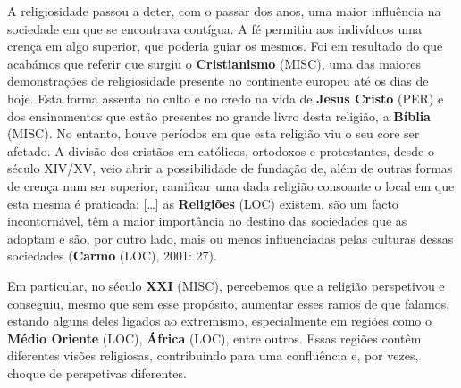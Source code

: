 \documentclass[12pt,a4paper]{article}
\begin{document}
A religiosidade passou a deter, com o passar dos anos, uma maior influência na sociedade em que se encontrava contígua. A fé permitiu aos indivíduos uma crença em algo superior, que poderia guiar os mesmos. Foi em resultado do que acabámos que referir que surgiu o \textbf{Cristianismo} (MISC), uma das maiores demonstrações de religiosidade presente no continente europeu até os dias de hoje. Esta forma assenta no culto e no credo na vida de \textbf{Jesus  Cristo} (PER)  e  dos  ensinamentos  que  estão  presentes  no  grande  livro  desta  religião,  a \textbf{Bíblia} (MISC).  No  entanto,  houve  períodos  em  que  esta  religião  viu  o  seu core ser  afetado.  A divisão dos cristãos em católicos, ortodoxos e protestantes, desde o século XIV/XV, veio abrir a possibilidade de fundação de, além de outras formas de crença num ser superior, ramificar uma dada religião consoante o local em que esta mesma é praticada: […] as \textbf{Religiões} (LOC) existem, são um facto incontornável, têm a maior importância no destino das sociedades que as adoptam e são, por outro lado, mais ou menos influenciadas pelas culturas dessas sociedades (\textbf{Carmo} (LOC), 2001: 27).

Em particular, no século \textbf{XXI} (MISC), percebemos que a religião perspetivou e conseguiu, mesmo que sem  esse propósito,  aumentar  esses  ramos de que falamos, estando alguns deles ligados ao extremismo, especialmente em regiões como o \textbf{Médio Oriente} (LOC), \textbf{África} (LOC), entre  outros.  Essas  regiões  contêm  diferentes  visões  religiosas,  contribuindo  para  uma confluência e, por vezes, choque de perspetivas diferentes.
\end{document}
